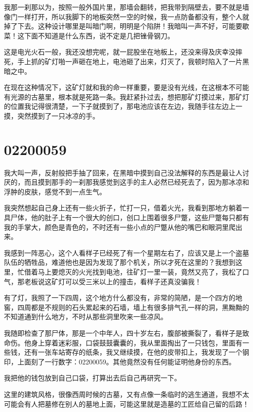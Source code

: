 我那一刹那以为，按照一般外国片里，那墙会翻转，把我带到隔壁去，要不就是墙像门一样打开，所以我脚下的地板突然一空的时候，我一点防备都没有，整个人就掉了下去。这种设计哪里是叫暗门啊，明明是个陷阱！我暗叫一声不好，可能要歇菜！这下面不知道是什么东西，说不定是几把锉骨钢刀。

这是电光火石一般，我还没想完呢，就一屁股坐在地板上，还没来得及庆幸没摔死，手上抓的矿灯啪一声砸在地上，电池砸了出来，灯灭了，我顿时陷入了一片黑暗之中。

在现在这种情况下，这矿灯就和我的命一样重要，要是没有光线，在这根本不可能有光源的古墓里，根本就是死路一条。我赶紧扑过去，想把那矿灯摸过来，那矿灯的位置我记得很清楚，一下子就摸到了，那电池应该在左边，我随手往左边上一摸，突然摸到了一只冰凉的手。

\chapter{02200059}

我大叫一声，反射般把手抽了回来，在黑暗中摸到自己没法解释的东西是最让人讨厌的，而且摸到那手的一刹那我感觉到这手的主人必然已经死去了，因为那冰凉和浮肿的皮肤，感觉不到一点生气。

我突然想起自己身上还有一些火折子，忙打一只，借着火光，我看到那地方躺着一具尸体，他的肚子上有一个很大的创口，创口上围着很多尸蹩，这些尸蹩每只都有我的手掌大，颜色是青色的，不时还有一些小点的尸蹩从他的嘴巴和眼洞里爬出来。

我感到一阵恶心，这个人看样子已经死了有一个星期左右了，应该又是上一个盗墓队伍的牺牲品，难道他也是因为发现了那个机关，所以才死在这里的？我想到这里，忙借着马上要熄灭的火光找到电池，往矿灯一里一装，竟然又亮了，我松了口气，那老板说这矿灯可以受三米以上的撞击，看样子还真没骗我！

有了灯，我照了一下四周，这个地方什么都没有，非常的简陋，是一个四方的地窖，四周都是不规则的石头累起来的石墙，墙上有很多排气孔一样的洞，黑黝黝的不知道通到什么地方，不时从那些洞里吹来一些凉风。

我随即检查了那尸体，那是一个中年人，四十岁左右，腹部被撕裂了，看样子是致命伤。他身上穿着迷彩服，口袋鼓鼓囊囊的，我从里面掏出了一只钱包，里面有一些钱，还有一张车站寄存的纸条，我又继续摸，在他的皮带扣上，我发现了一个钢印，上面刻了一行数字：02200059。其他竟然没有任何能证明他身份的东西。

我把他的钱包放到自己口袋，打算出去后自己再研究一下。

这里的建筑风格，很像西周时候的古墓，又有点像一条临时的逃生通道，我想不太可能会有人把墓修在别人的墓地上面，可能这里就是造墓的工匠给自己留的后路！

